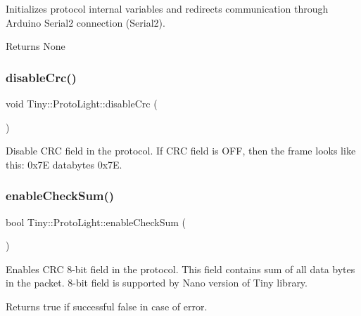 Initializes protocol internal variables and redirects communication through Arduino Serial2 connection (Serial2). \begin{DoxyReturn}{Returns}
None 
\end{DoxyReturn}
\mbox{\label{classTiny_1_1ProtoLight_af93e0591ca33137ad79ffb054953001c}} 
\subsubsection{\texorpdfstring{disable\+Crc()}{disableCrc()}}
{\footnotesize\ttfamily void Tiny\+::\+Proto\+Light\+::disable\+Crc (\begin{DoxyParamCaption}{ }\end{DoxyParamCaption})}

Disable C\+RC field in the protocol. If C\+RC field is O\+FF, then the frame looks like this\+: 0x7E databytes 0x7E. \mbox{\label{classTiny_1_1ProtoLight_ad7b4ef5a43c187f0d1915efe7450bc40}} 
\subsubsection{\texorpdfstring{enable\+Check\+Sum()}{enableCheckSum()}}
{\footnotesize\ttfamily bool Tiny\+::\+Proto\+Light\+::enable\+Check\+Sum (\begin{DoxyParamCaption}{ }\end{DoxyParamCaption})}

Enables C\+RC 8-\/bit field in the protocol. This field contains sum of all data bytes in the packet. 8-\/bit field is supported by Nano version of Tiny library. \begin{DoxyReturn}{Returns}
true if successful false in case of error. 
\end{DoxyReturn}
\mbox{\label{classTiny_1_1ProtoLight_a110b654e476691518790edcc5bf1bd80}} 
